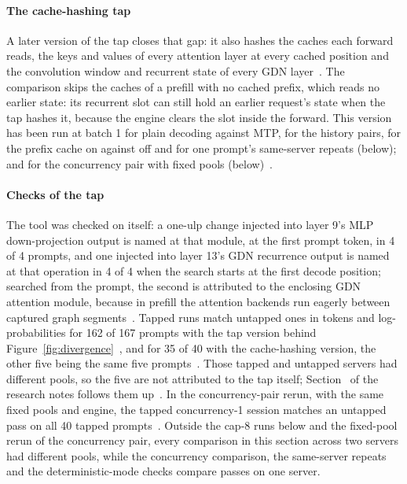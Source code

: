 \paragraph{The cache-hashing tap} A later version of the tap closes that gap: it also hashes the caches each forward reads, the keys and values of every attention layer at every cached position and the convolution window and recurrent state of every GDN layer~. The comparison skips the caches of a prefill with no cached prefix, which reads no earlier state: its recurrent slot can still hold an earlier request's state when the tap hashes it, because the engine clears the slot inside the forward. This version has been run at batch 1 for plain decoding against MTP, for the history pairs, for the prefix cache on against off and for one prompt's same-server repeats (below); and for the concurrency pair with fixed pools (below)~.

\paragraph{Checks of the tap} The tool was checked on itself: a one-ulp change injected into layer 9's MLP down-projection output is named at that module, at the first prompt token, in 4 of 4 prompts, and one injected into layer 13's GDN recurrence output is named at that operation in 4 of 4 when the search starts at the first decode position; searched from the prompt, the second is attributed to the enclosing GDN attention module, because in prefill the attention backends run eagerly between captured graph segments~. Tapped runs match untapped ones in tokens and log-probabilities for 162 of 167 prompts with the tap version behind Figure~\ref{fig:divergence}~, and for 35 of 40 with the cache-hashing version, the other five being the same five prompts~. Those tapped and untapped servers had different pools, so the five are not attributed to the tap itself; Section~ of the research notes follows them up~. In the concurrency-pair rerun, with the same fixed pools and engine, the tapped concurrency-1 session matches an untapped pass on all 40 tapped prompts~. Outside the cap-8 runs below and the fixed-pool rerun of the concurrency pair, every comparison in this section across two servers had different pools, while the concurrency comparison, the same-server repeats and the deterministic-mode checks compare passes on one server.

